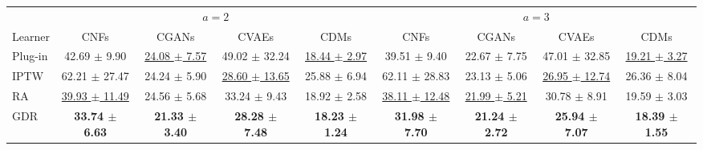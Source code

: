 \begin{tabu}{l|cccc|cccc}
\toprule
 &  &  \\
Learner & CNFs & CGANs & CVAEs & CDMs & CNFs & CGANs & CVAEs & CDMs \\
\midrule
Plug-in & 42.69 $\pm$ 9.90 & \underline{24.08 $\pm$ 7.57} & 49.02 $\pm$ 32.24 & \underline{18.44 $\pm$ 2.97} & 39.51 $\pm$ 9.40 & 22.67 $\pm$ 7.75 & 47.01 $\pm$ 32.85 & \underline{19.21 $\pm$ 3.27} \\
IPTW & 62.21 $\pm$ 27.47 & 24.24 $\pm$ 5.90 & \underline{28.60 $\pm$ 13.65} & 25.88 $\pm$ 6.94 & 62.11 $\pm$ 28.83 & 23.13 $\pm$ 5.06 & \underline{26.95 $\pm$ 12.74} & 26.36 $\pm$ 8.04 \\
RA & \underline{39.93 $\pm$ 11.49} & 24.56 $\pm$ 5.68 & 33.24 $\pm$ 9.43 & 18.92 $\pm$ 2.58 & \underline{38.11 $\pm$ 12.48} & \underline{21.99 $\pm$ 5.21} & 30.78 $\pm$ 8.91 & 19.59 $\pm$ 3.03 \\
GDR & \textbf{33.74 $\pm$ 6.63} & \textbf{21.33 $\pm$ 3.40} & \textbf{28.28 $\pm$ 7.48} & \textbf{18.23 $\pm$ 1.24} & \textbf{31.98 $\pm$ 7.70} & \textbf{21.24 $\pm$ 2.72} & \textbf{25.94 $\pm$ 7.07} & \textbf{18.39 $\pm$ 1.55} \\
\bottomrule
\end{tabu}

